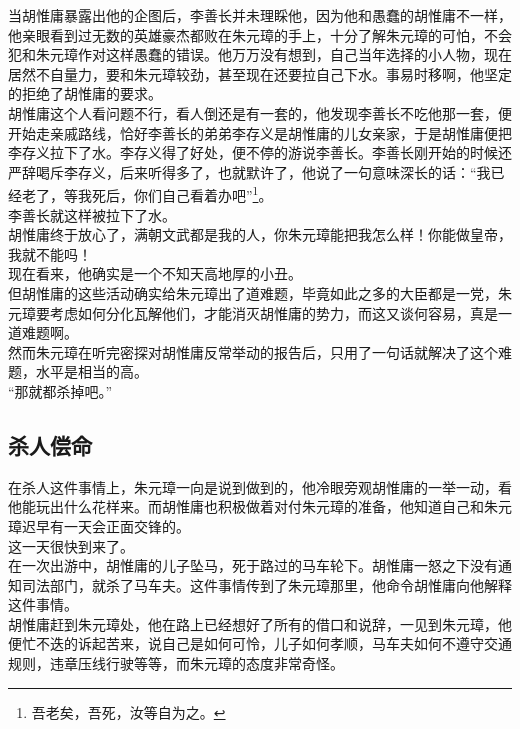 \begin{multicols}{\theparacolNo}
当胡惟庸暴露出他的企图后，李善长并未理睬他，因为他和愚蠢的胡惟庸不一样，他亲眼看到过无数的英雄豪杰都败在朱元璋的手上，十分了解朱元璋的可怕，不会犯和朱元璋作对这样愚蠢的错误。他万万没有想到，自己当年选择的小人物，现在居然不自量力，要和朱元璋较劲，甚至现在还要拉自己下水。事易时移啊，他坚定的拒绝了胡惟庸的要求。\\

胡惟庸这个人看问题不行，看人倒还是有一套的，他发现李善长不吃他那一套，便开始走亲戚路线，恰好李善长的弟弟李存义是胡惟庸的儿女亲家，于是胡惟庸便把李存义拉下了水。李存义得了好处，便不停的游说李善长。李善长刚开始的时候还严辞喝斥李存义，后来听得多了，也就默许了，他说了一句意味深长的话：“我已经老了，等我死后，你们自己看着办吧”\footnote{吾老矣，吾死，汝等自为之。}。\\

李善长就这样被拉下了水。\\

胡惟庸终于放心了，满朝文武都是我的人，你朱元璋能把我怎么样！你能做皇帝，我就不能吗！\\

现在看来，他确实是一个不知天高地厚的小丑。\\

但胡惟庸的这些活动确实给朱元璋出了道难题，毕竟如此之多的大臣都是一党，朱元璋要考虑如何分化瓦解他们，才能消灭胡惟庸的势力，而这又谈何容易，真是一道难题啊。\\

然而朱元璋在听完密探对胡惟庸反常举动的报告后，只用了一句话就解决了这个难题，水平是相当的高。\\

“那就都杀掉吧。”\\

\subsection{杀人偿命}
在杀人这件事情上，朱元璋一向是说到做到的，他冷眼旁观胡惟庸的一举一动，看他能玩出什么花样来。而胡惟庸也积极做着对付朱元璋的准备，他知道自己和朱元璋迟早有一天会正面交锋的。\\

这一天很快到来了。\\

在一次出游中，胡惟庸的儿子坠马，死于路过的马车轮下。胡惟庸一怒之下没有通知司法部门，就杀了马车夫。这件事情传到了朱元璋那里，他命令胡惟庸向他解释这件事情。\\

胡惟庸赶到朱元璋处，他在路上已经想好了所有的借口和说辞，一见到朱元璋，他便忙不迭的诉起苦来，说自己是如何可怜，儿子如何孝顺，马车夫如何不遵守交通规则，违章压线行驶等等，而朱元璋的态度非常奇怪。\\


\end{multicols}
